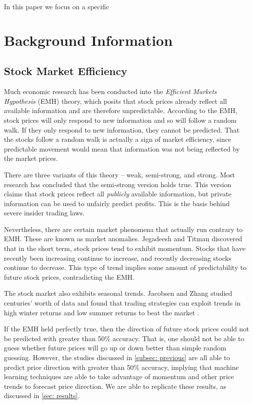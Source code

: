\documentclass[pageno]{jpaper}
\begin{document}
In this paper we focus on a specific 

\section{Background Information}
\subsection{Stock Market Efficiency}
\label{subsec: stock}
Much economic research has been conducted into the {\em Efficient Markets Hypothesis} (EMH) theory, which posits that stock prices already reflect all available information \cite{bodie} and are therefore unpredictable. According to the EMH, stock prices will only respond to new information and so will follow a random walk. If they only respond to new information, they cannot be predicted. That the stocks follow a random walk is actually a sign of market efficiency, since predictable movement would mean that information was not being reflected by the market prices.

There are three variants of this theory -- weak, semi-strong, and strong. Most research has concluded that the semi-strong version holds true. This version claims that stock prices reflect all {\em publicly} available information, but private information can be used to unfairly predict profits. This is the basis behind severe insider trading laws.

Nevertheless, there are certain market phenomena that actually run contrary to EMH. These are known as market anomalies. Jegadeesh and Titman discovered that in the short term, stock prices tend to exhibit momentum\cite{jegadeesh}. Stocks that have recently been increasing continue to increase, and recently decreasing stocks continue to decrease. This type of trend implies some amount of predictability to future stock prices, contradicting the EMH. 

The stock market also exhibits seasonal trends. Jacobsen and Zhang studied centuries' worth of data and found that trading strategies can exploit trends in high winter returns and low summer returns to beat the market \cite{jacobsen2}\cite{jacobsen1}.

If the EMH held perfectly true, then the direction of future stock prices could not be predicted with greater than 50\% accuracy. That is, one should not be able to guess whether future prices will go up or down better than simple random guessing. However, the studies discussed in \ref{subsec: previous} are all able to predict price direction with greater than 50\% accuracy, implying that machine learning techniques are able to take advantage of momentum and other price trends to forecast price direction. We are able to replicate these results, as discussed in \ref{sec: results}.
\end{document}
